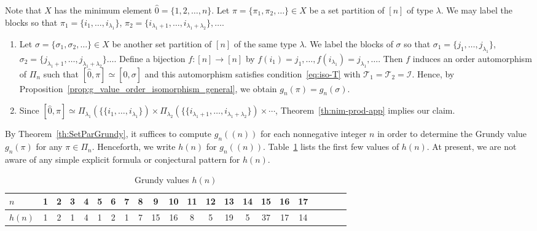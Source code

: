 \documentclass[a4paper,11pt]{amsart}
\theoremstyle{definition}
\newenvironment{demo}[1]{%
  \trivlist
  \item[\hskip\labelsep
        {\bf #1.}]
}{%
\hfill\qedsymbol
  \endtrivlist
}
\numberwithin{equation}{section}
\def\T{\mathscr{T}}
\def\I{\mathscr{I}}
\begin{document}
%
\begin{demo}{Proof}
%
Note that $X$ has the minimum element $\hat0=\{1,2,\dots,n\}$.
Let $\pi=\{\pi_{1},\pi_{2},\dots\}\in X$
be a set partition of $[n]$ of type $\lambda$.
We may label the blocks so that $\pi_{1}=\{i_{1},\dots,i_{\lambda_{1}}\}$,
$\pi_{2}=\{i_{\lambda_{1}+1},\dots,i_{\lambda_{1}+\lambda_{2}}\},\dots$.
%
\begin{enumerate}[label=(\roman*)]
%
\item
Let $\sigma=\{\sigma_{1},\sigma_{2},\dots\}\in X$ be another set partition of $[n]$ of the same type $\lambda$.
We label the blocks of $\sigma$ so that 
$\sigma_{1}=\{j_{1},\dots,j_{\lambda_{1}}\}$,
$\sigma_{2}=\{j_{\lambda_{1}+1},\dots,j_{\lambda_{1}+\lambda_{2}}\}\dots$.
Define a bijection $f:[n]\to[n]$ by $f(i_{1})=j_{1},\dots,f(i_{\lambda_{1}})=j_{\lambda_{1}},\dots$.
Then $f$ induces an order automorphism of $\Pi_{n}$ such that $[\hat0,\pi]\simeq[\hat0,\sigma]$ 
and this automorphism satisfies condition~\eqref{eq:iso-T} with $\T_{1}=\T_{2}=\I$.
Hence, by Proposition~\ref{prop:g_value_order_isomorphism_general},
we obtain $g_{n}(\pi)=g_{n}(\sigma)$.
%
\item
%
Since $[\hat0,\pi]\simeq\Pi_{\lambda_{1}}(\{\{i_{1},\dots,i_{\lambda_{1}}\})\times\Pi_{\lambda_{2}}(\{\{i_{\lambda_{1}+1},\dots,i_{\lambda_{1}+\lambda_{2}}\})\times\cdots$,
Theorem~\ref{th:nim-prod-app} implies our claim.
%
\end{enumerate}
%
\end{demo}
%
By Theorem~\ref{th:SetParGrundy},
it suffices to compute $g_{n}((n))$ for each nonnegative integer $n$ 
in order to determine the Grundy value $g_{n}(\pi)$ for any $\pi\in\Pi_{n}$.
Henceforth, we write $h(n)$ for $g_{n}((n))$.
Table~\ref{tb:h(n)} lists the first few values of $h(n)$.
At present, we are not aware of any simple explicit formula or conjectural pattern for $h(n)$.
%
\begin{table}[h]
 \begin{center}
	\begin{tabular}{|l||c|c|c|c|c|c|c|c|c|c|c|c|c|c|c|c|c|c|c|c|c|} 
	\hline
$n$     &   1 &  2 &  3 &  4 &  5 &  6 &  7 &  8 &  9 & 10 & 11 & 12 & 13 & 14 & 15 & 16 & 17 %
\\\hline
$h(n)$ &   1 &  2 &  1 &  4 &  1 &  2 &  1 &  7 & 15 & 16 &  8 &  5 & 19 &  5 & 37 & 17 & 14 %
\\\hline
	\end{tabular}
   \caption{Grundy values $h(n)$}\label{tb:h(n)}
 \end{center}
\end{table}
\end{document}
